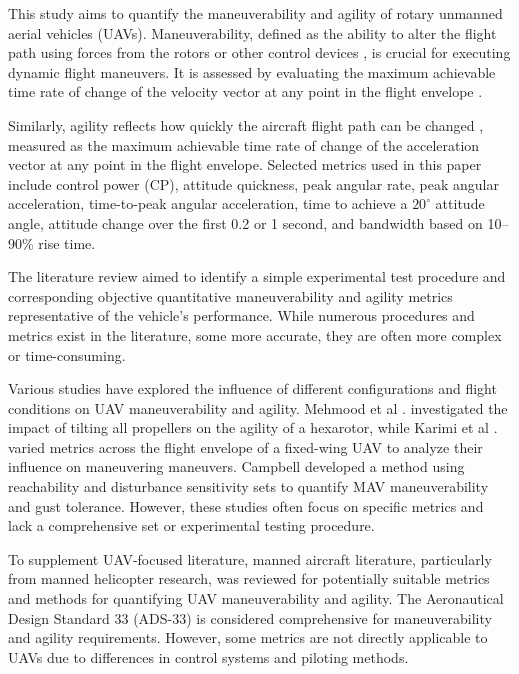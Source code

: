 This study aims to quantify the maneuverability and agility of rotary unmanned aerial vehicles (UAVs). Maneuverability, defined as the ability to alter the flight path using forces from the rotors or other control devices \cite{Lawrence1991}, is crucial for executing dynamic flight maneuvers. It is assessed by evaluating the maximum achievable time rate of change of the velocity vector at any point in the flight envelope \cite{Whalley1991}.

Similarly, agility reflects how quickly the aircraft flight path can be changed \cite{Lawrence1991}, measured as the maximum achievable time rate of change of the acceleration vector at any point in the flight envelope. Selected metrics used in this paper include control power (CP), attitude quickness, peak angular rate, peak angular acceleration, time-to-peak angular acceleration, time to achieve a $20^\circ$ attitude angle, attitude change over the first 0.2 or 1 second, and bandwidth based on 10–90\% rise time.

The literature review aimed to identify a simple experimental test procedure and corresponding objective quantitative maneuverability and agility metrics representative of the vehicle’s performance. While numerous procedures and metrics exist in the literature, some more accurate, they are often more complex or time-consuming.

Various studies have explored the influence of different configurations and flight conditions on UAV maneuverability and agility. Mehmood et al \cite{Mehmood2016}. investigated the impact of tilting all propellers on the agility of a hexarotor, while Karimi et al \cite{Karimi2011}. varied metrics across the flight envelope of a fixed-wing UAV to analyze their influence on maneuvering maneuvers. Campbell \cite{Campbell2012} developed a method using reachability and disturbance sensitivity sets to quantify MAV maneuverability and gust tolerance. However, these studies often focus on specific metrics and lack a comprehensive set or experimental testing procedure.

To supplement UAV-focused literature, manned aircraft literature, particularly from manned helicopter research, was reviewed for potentially suitable metrics and methods for quantifying UAV maneuverability and agility. The Aeronautical Design Standard 33 (ADS-33) \cite{ADS-33} is considered comprehensive for maneuverability and agility requirements. However, some metrics are not directly applicable to UAVs due to differences in control systems and piloting methods.

